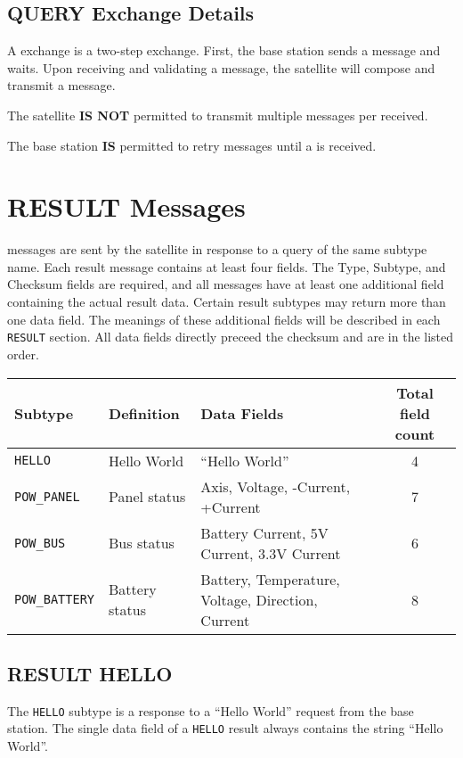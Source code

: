 \documentclass{article}
\begin{document}
  \subsection{QUERY Exchange Details}
  A \mquery exchange is a two-step exchange. First, the base station sends a \mquery message and waits.
  Upon receiving and validating a \mquery message, the satellite will compose and transmit a \mresult message.
  
  The satellite \textbf{IS NOT} permitted to transmit multiple \mresult
   messages per \mquery received.
  
  The base station \textbf{IS} permitted to retry \mquery messages until a \mresult is received.
  
 

\section{RESULT Messages}
  \mresult messages are sent by the satellite in response to a query of the same subtype name. Each result message contains at least four fields.
  The Type, Subtype, and Checksum fields are required, and all \mresult messages have at least one additional field containing the actual result
  data. Certain result subtypes may return more than one data field. The meanings of these additional
  fields will be described in each \texttt{RESULT} section. All data fields directly preceed the checksum and are in the listed order.
  
  \begin{center}
    \begin{tabular}{| l | l | l | c |}
      \hline
      Subtype & Definition & Data Fields & Total field count \\ \hline
      \texttt{HELLO} & Hello World & ``Hello World'' & 4\\
      \texttt{POW\_PANEL} & Panel status & Axis, Voltage, -Current, +Current & 7\\
      \texttt{POW\_BUS} & Bus status & Battery Current, 5V Current, 3.3V Current & 6 \\
      \texttt{POW\_BATTERY} & Battery status & Battery, Temperature, Voltage, Direction, Current & 8 \\
      \hline
    \end{tabular}
  \end{center}
  
  \subsection{RESULT HELLO}
    The \texttt{HELLO} subtype is a response to a ``Hello World'' request from the base station.
    The single data field of a \texttt{HELLO} result always contains the string ``Hello World''.
\end{document}
